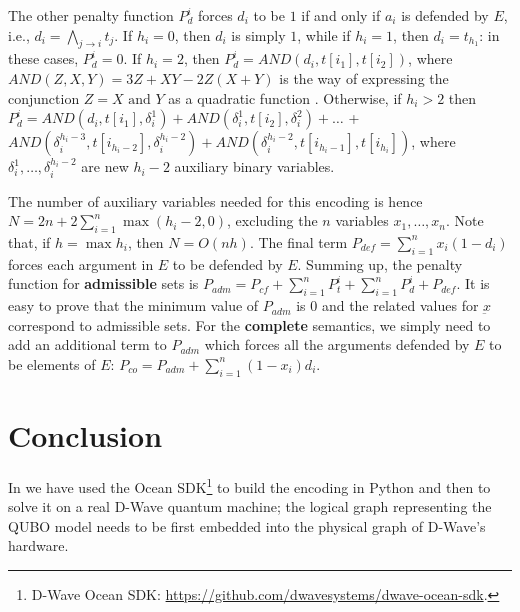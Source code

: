 \documentclass[conference]{IEEEtran}
\newcommand{\atts}{\ensuremath{\rightarrow}\xspace}
\begin{document}
The other penalty function $P_{d}^i$ forces $d_i$ to be $1$ if and only if $a_i$ is defended by $E$, i.e.,
$ d_i = \bigwedge_{j \atts i} t_j $.
If $h_i=0$, then $d_i$ is simply $1$, while if $h_i=1$, then $d_i=t_{h_1}$:
in these cases, $P_{d}^i=0$.
If $h_i=2$, then $P_{d}^i=AND(d_i,t[i_1],t[i_2])$, where
$ AND(Z,X,Y)=3Z+XY-2Z(X+Y) $
is the way of expressing the conjunction $Z=X\mbox{ and }Y$ as a quadratic function 
\cite{rosenberg}. Otherwise, if $h_i>2$ then
$ P_d^i=AND(d_i,t[i_1],\delta_i^1)+AND(\delta_i^1,t[i_2],\delta_i^2)+\dots$
+$ AND(\delta_i^{h_i-3},t[i_{h_i-2}],\delta_i^{h_i-2})+AND(\delta_i^{h_i-2},t[i_{h_i-1}], t[i_{h_i}])$, where $\delta_i^1,\dots,\delta_i^{h_i-2}$ are new $h_i-2$ auxiliary binary variables.

The number of auxiliary variables needed for this encoding is hence $N=2n+2\sum_{i=1}^n \max(h_i-2,0)$, excluding the $n$ variables $x_1,\dots,x_n$. 
Note that, if $h=\max h_i$, then $N=O(nh)$.
The final term $ P_{def}= \sum_{i=1}^n x_i(1-d_i) $
forces each argument in $E$ to be defended by $E$.
Summing up, the penalty function for \textbf{admissible} sets is
$ P_{adm}=P_{cf}+ \sum_{i=1}^n P_t^i + \sum_{i=1}^n P_d^i 
+ P_{def}$.
It is easy to prove that the minimum value of $P_{adm}$ is $0$ and the related values for $\underbar{x}$ correspond to admissible sets. For the \textbf{complete} semantics, we simply need to add an additional term to $P_{adm}$
which forces all the arguments defended by $E$ to be elements of $E$:
$ P_{co}=P_{adm} + \sum_{i=1}^n (1-x_i)d_i$.

\section{Conclusion}\label{sec:conclusion}
In \cite{pricai22} we have used the Ocean SDK\footnote{D-Wave Ocean SDK: \url{https://github.com/dwavesystems/dwave-ocean-sdk}.} to build the encoding in Python and then to solve it on a real D-Wave quantum machine; the logical graph representing the QUBO  model needs to be first embedded into the physical graph of D-Wave's hardware.



\end{document}
